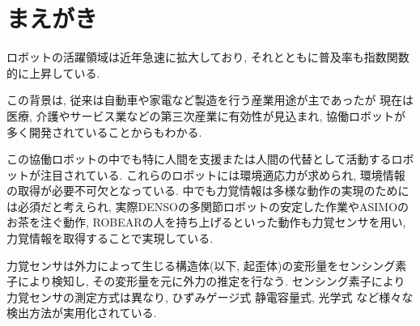 \section{まえがき} 

ロボットの活躍領域は近年急速に拡大しており, それとともに普及率も指数関数的に上昇している. 

この背景は, 従来は自動車や家電など製造を行う産業用途が主であったが
現在は医療, 介護やサービス業などの第三次産業に有効性が見込まれ, 
協働ロボットが多く開発されていることからもわかる.

この協働ロボットの中でも特に人間を支援または人間の代替として活動するロボットが注目されている. 
これらのロボットには環境適応力が求められ, 環境情報の取得が必要不可欠となっている.
中でも力覚情報は多様な動作の実現のためには必須だと考えられ, 
実際DENSOの多関節ロボット\cite{denso}の安定した作業やASIMO\cite{asimo}のお茶を注ぐ動作, 
ROBEAR\cite{ROBEAR}の人を持ち上げるといった動作も力覚センサを用い, 
力覚情報を取得することで実現している.

力覚センサは外力によって生じる構造体(以下, 起歪体)の変形量をセンシング素子により検知し,
その変形量を元に外力の推定を行なう. 
センシング素子により力覚センサの測定方式は異なり, 
ひずみゲージ式\cite{yoshikawa1989six}%
静電容量式\cite{Beyeler2009}, 
光学式\cite{Kim2013a}%
など様々な検出方法が実用化されている. 



